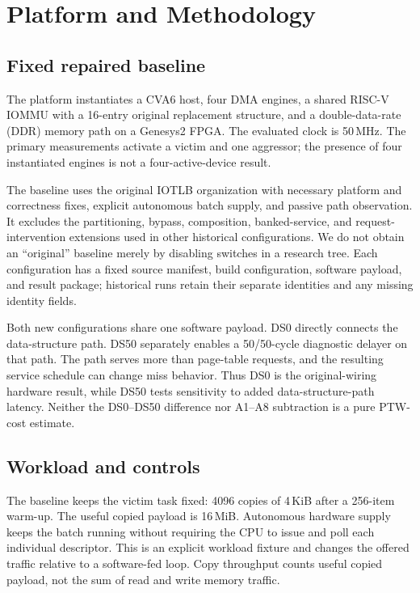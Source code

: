 \section{Platform and Methodology}
\subsection{Fixed repaired baseline}
The platform instantiates a CVA6 host, four DMA engines, a shared RISC-V IOMMU with a 16-entry original replacement structure, and a double-data-rate (DDR) memory path on a Genesys2 FPGA. The evaluated clock is 50\,MHz. The primary measurements activate a victim and one aggressor; the presence of four instantiated engines is not a four-active-device result.

The baseline uses the original IOTLB organization with necessary platform and correctness fixes, explicit autonomous batch supply, and passive path observation. It excludes the partitioning, bypass, composition, banked-service, and request-intervention extensions used in other historical configurations. We do not obtain an ``original'' baseline merely by disabling switches in a research tree. Each configuration has a fixed source manifest, build configuration, software payload, and result package; historical runs retain their separate identities and any missing identity fields.

Both new configurations share one software payload. DS0 directly connects the data-structure path. DS50 separately enables a 50/50-cycle diagnostic delayer on that path. The path serves more than page-table requests, and the resulting service schedule can change miss behavior. Thus DS0 is the original-wiring hardware result, while DS50 tests sensitivity to added data-structure-path latency. Neither the DS0--DS50 difference nor A1--A8 subtraction is a pure PTW-cost estimate.

\subsection{Workload and controls}
The baseline keeps the victim task fixed: 4096 copies of 4\,KiB after a 256-item warm-up. The useful copied payload is 16\,MiB. Autonomous hardware supply keeps the batch running without requiring the CPU to issue and poll each individual descriptor. This is an explicit workload fixture and changes the offered traffic relative to a software-fed loop. Copy throughput counts useful copied payload, not the sum of read and write memory traffic.

